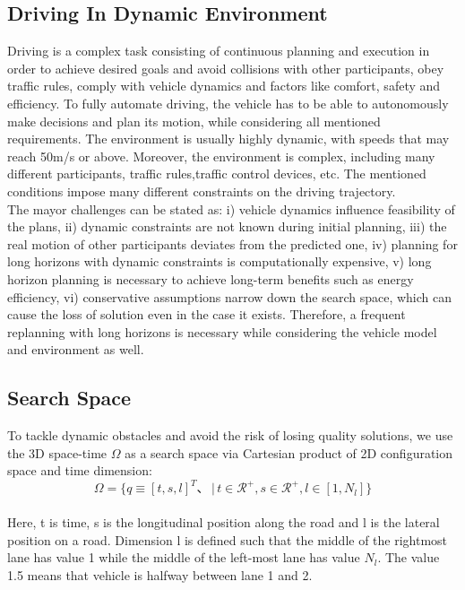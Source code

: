 \documentclass{report}
\begin{document}
 \subsection{Driving In Dynamic Environment}
 Driving is a complex task consisting of continuous planning and execution in order to achieve desired goals and avoid collisions with other participants, obey traffic rules, comply with vehicle dynamics and factors like comfort, safety and efficiency. To fully automate driving, the vehicle has to be able to autonomously make decisions and plan its motion, while considering all mentioned requirements. The environment is usually highly dynamic, with speeds that may reach 50m/s or above. Moreover, the environment is complex, including many different participants, traffic rules,traffic control devices, etc. The mentioned conditions impose many different constraints on the driving trajectory.\\
 \indent
 The mayor challenges can be stated as: i) vehicle dynamics influence feasibility of the plans, ii) dynamic constraints are not known during initial planning, iii) the real motion of other participants deviates from the predicted one, iv) planning for long horizons with dynamic constraints is computationally expensive, v) long horizon planning is necessary to achieve long-term benefits such as energy efficiency, vi) conservative assumptions narrow down the search space, which can cause the loss of solution even in the case it exists. Therefore, a frequent replanning with long horizons is necessary while considering the vehicle model and environment as well.
 \subsection{Search Space}
 To tackle dynamic obstacles and avoid the risk of losing quality solutions, we use the 3D space-time $\Omega$ as a search space via Cartesian product of 2D configuration space and time dimension:\\
 \begin{equation}\label{def:ratio}
 \Omega = \{q \equiv [t,s,l]^T 、\, |\, t\in \mathcal{R}^+, s\in \mathcal{R}^+ ,l \in[1,N_l]\}
 \end{equation}\\
 \indent
 Here, t is time, s is the longitudinal position along the road and l is the lateral position on a road. Dimension l is defined such that the middle of the rightmost lane has value 1 while the middle of the left-most lane has value $N_l$. The value 1.5 means that vehicle is halfway between lane 1 and 2.
\end{document}

